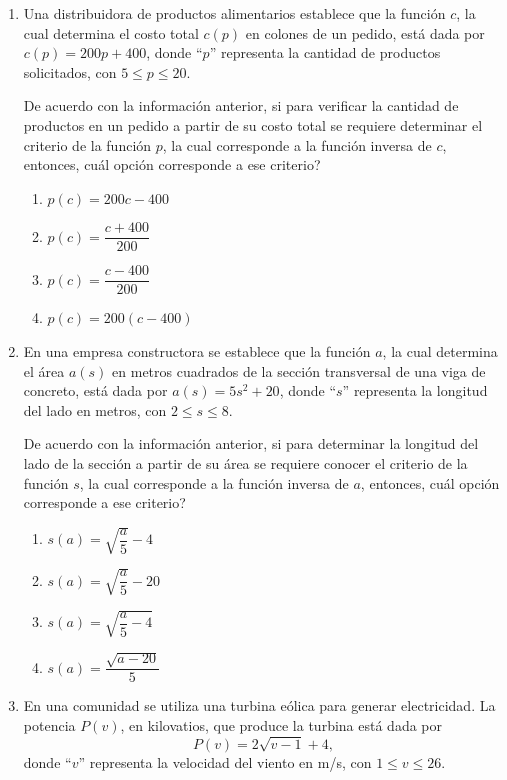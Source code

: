 \documentclass[11pt]{article}
\newcommand{\opcion}[2]{\item $#2$}
\begin{document}
\begin{enumerate}[label=\textbf{\arabic*.}, itemsep=2.5cm]
\Needspace{0.60\textheight}
\item
Una distribuidora de productos alimentarios establece que la funci\'on $c$, la cual determina el costo total $c(p)$ en colones de un pedido, est\'a dada por $c(p) = 200p + 400$, donde ``$p$'' representa la cantidad de productos solicitados, con $5 \leq p \leq 20$.

De acuerdo con la informaci\'on anterior, si para verificar la cantidad de productos en un pedido a partir de su costo total se requiere determinar el criterio de la funci\'on $p$, la cual corresponde a la funci\'on inversa de $c$, entonces, \textquestiondown cu\'al opci\'on corresponde a ese criterio?

\begin{enumerate}[label=\Alph*)]
  \item $p(c) = 200c - 400$
  \item $p(c) = \dfrac{c + 400}{200}$
  \opcion{C}{p(c) = \dfrac{c - 400}{200}}
  \item $p(c) = 200(c - 400)$
\end{enumerate}

\Needspace{0.62\textheight}
\item
En una empresa constructora se establece que la funci\'on $a$, la cual determina el \'area $a(s)$ en metros cuadrados de la secci\'on transversal de una viga de concreto, est\'a dada por $a(s) = 5s^2 + 20$, donde ``$s$'' representa la longitud del lado en metros, con $2 \leq s \leq 8$.

De acuerdo con la informaci\'on anterior, si para determinar la longitud del lado de la secci\'on a partir de su \'area se requiere conocer el criterio de la funci\'on $s$, la cual corresponde a la funci\'on inversa de $a$, entonces, \textquestiondown cu\'al opci\'on corresponde a ese criterio?

\begin{enumerate}[label=\Alph*)]
  \item $s(a) = \sqrt{\dfrac{a}{5}} - 4$
  \item $s(a) = \sqrt{\dfrac{a}{5}} - 20$
  \opcion{C}{s(a) = \sqrt{\dfrac{a}{5} - 4}}
  \item $s(a) = \dfrac{\sqrt{a - 20}}{5}$
\end{enumerate}

\Needspace{0.42\textheight}
\item
En una comunidad se utiliza una turbina e\'olica para generar electricidad. La potencia $P(v)$, en kilovatios, que produce la turbina est\'a dada por
\[P(v) = 2\sqrt{v-1}+4,\]
donde ``$v$'' representa la velocidad del viento en m/s, con $1 \leq v \leq 26$.


\end{enumerate}
\end{document}
